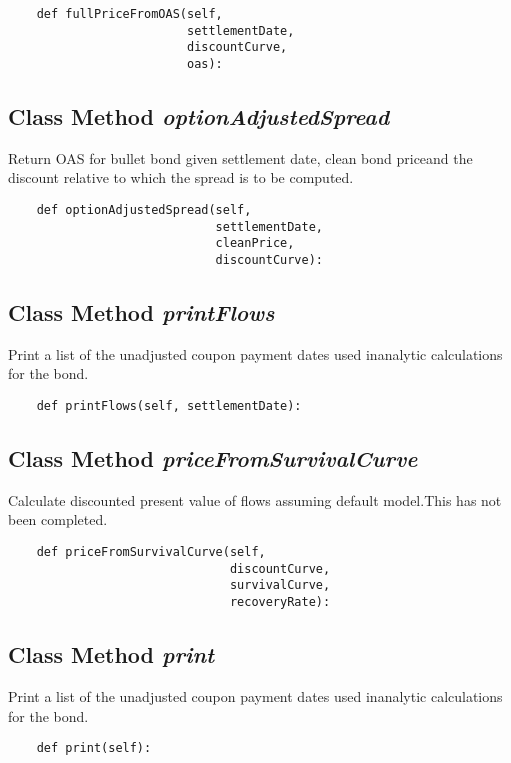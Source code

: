 \documentclass[twoside,11pt]{book}
\begin{document}
\begin{lstlisting}
    def fullPriceFromOAS(self,
                         settlementDate,
                         discountCurve,
                         oas):
\end{lstlisting}

\subsection{Class Method {\it optionAdjustedSpread}}
Return OAS for bullet bond given settlement date, clean bond priceand the discount relative to which the spread is to be computed. 

\begin{lstlisting}
    def optionAdjustedSpread(self,
                             settlementDate,
                             cleanPrice,
                             discountCurve):
\end{lstlisting}

\subsection{Class Method {\it printFlows}}
Print a list of the unadjusted coupon payment dates used inanalytic calculations for the bond. 

\begin{lstlisting}
    def printFlows(self, settlementDate):
\end{lstlisting}

\subsection{Class Method {\it priceFromSurvivalCurve}}
Calculate discounted present value of flows assuming default model.This has not been completed. 

\begin{lstlisting}
    def priceFromSurvivalCurve(self,
                               discountCurve,
                               survivalCurve,
                               recoveryRate):
\end{lstlisting}

\subsection{Class Method {\it print}}
Print a list of the unadjusted coupon payment dates used inanalytic calculations for the bond. 

\begin{lstlisting}
    def print(self):
\end{lstlisting}
\end{document}
